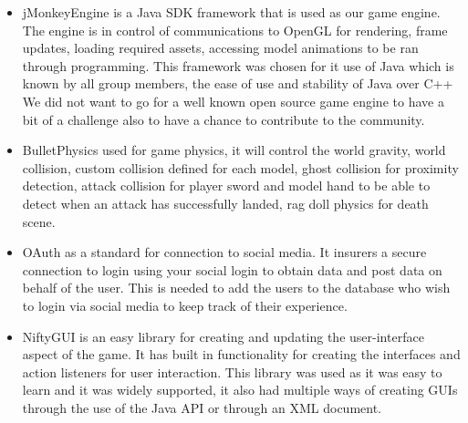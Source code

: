 \documentclass[letterpaper]{article}
\begin{document}
			\begin{itemize}
				\item jMonkeyEngine is a Java SDK framework that is used as our game engine. The engine is in control of communications to OpenGL for rendering, frame updates, loading required assets, accessing model animations to be ran through programming. This framework was chosen for it use of Java which is known by all group members, the ease of use and stability of Java over C++ We did not want to go for a well known open source game engine to have a bit of a challenge also to have a chance to contribute to the community.
				\item BulletPhysics used for game physics, it will control the world gravity, world collision, custom collision defined for each model, ghost collision for proximity detection, attack collision for player sword and model hand to be able to detect when an attack has successfully landed, rag doll physics for death scene.
				\item OAuth as a standard for connection to social media. It insurers a secure connection to login using your social login to obtain data and post data on behalf of the user. This is needed to add the users to the database who wish to login via social media to keep track of their experience.
				\item NiftyGUI is an easy library for creating and updating the user-interface aspect of the game. It has built in functionality for creating the interfaces and action listeners for user interaction. This library was used as it was easy to learn and it was widely supported, it also had multiple ways of creating GUIs through the use of the Java API or through an XML document.
			\end{itemize}
			
		\vspace{0.2in}
		\section*{\colorbox{black}{}}
		\vspace{0.1in}
			
\end{document}
